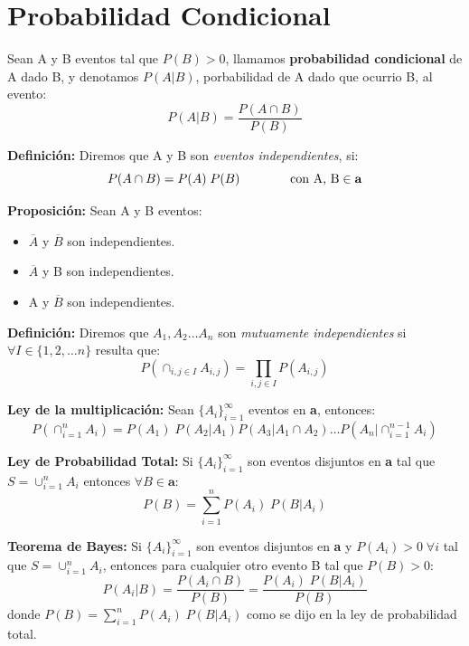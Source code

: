 \documentclass[12pt,a4paper]{report}
\begin{document}
		
	\section{Probabilidad Condicional}
		\par Sean A y B eventos tal que $P(B) > 0$, llamamos \textbf{probabilidad condicional} de A dado B, y denotamos $P(A | B)$, porbabilidad de A dado que ocurrio B, al evento:
		\[
			P(A | B) = \frac{P(A \cap B)}{P(B)}
		\]
		
		\vspace{3mm}
		\par \textbf{Definición:} Diremos que A y B son \textit{eventos independientes}, si:
		\[
			P(A \cap B) = P(A) \; P(B) \qquad\qquad \textup{con A, B} \in \textbf{a}
		\]
	
		\vspace{3mm}
		\par \textbf{Proposición:} Sean A y B eventos:
		\begin{itemize}
			\item $\overline{A}$ y $\overline{B}$ son independientes.
			\item $\overline{A}$ y B son independientes.
			\item A y $\overline{B}$ son independientes.
		\end{itemize}
		
		\vspace{3mm}
		\par \textbf{Definición:} Diremos que $A_{1}, A_{2} \dotsc A_{n}$ son \textit{mutuamente independientes} si $\forall I \in \lbrace 1, 2, \dotsc n \rbrace$ resulta que:
		\[
			P(\cap_{i, j \in I} A_{i, j}) = \prod_{i, j \in I} P(A_{i, j})
		\]
		
		\vspace{3mm}
		\par \textbf{Ley de la multiplicación:} Sean $\lbrace A_{i} \rbrace_{i=1}^{\infty}$
eventos en \textbf{a}, entonces:
		\[
			P(\cap_{i = 1}^{n} A_{i}) = P(A_{1}) \; P(A_{2} | A_{1}) P(A_{3} | A_{1} \cap A_{2}) \dotsc P(A_{n} | \cap_{i=1}^{n - 1} A_{i})
		\]
		
		\vspace{3mm}
		\par \textbf{Ley de Probabilidad Total:} Si $\lbrace A_{i} \rbrace_{i=1}^{\infty}$ son eventos disjuntos en \textbf{a} tal que $S = \cup_{i=1}^{n} A_{i}$ entonces $\forall B \in \textbf{a}$:
		\[
			P(B) = \sum_{i=1}^{n} P(A_{i}) \; P(B | A_{i})
		\]
		
		\vspace{3mm}
		\par \textbf{Teorema de Bayes:} Si $\lbrace A_{i} \rbrace_{i=1}^{\infty}$ son eventos disjuntos en \textbf{a} y $P(A_{i}) > 0 \; \forall i$ tal que $S = \cup_{i=1}^{n} A_{i}$, entonces para cualquier otro evento B tal que $P(B) > 0$:
		\[
			P(A_{i} | B) = \frac{P(A_{i} \cap B)}{P(B)} = \frac{P(A_{i}) \; P(B | A_{i})}{P(B)}
		\]
		donde $P(B) = \sum_{i=1}^{n} P(A_{i}) \; P(B | A_{i})$ como se dijo en la ley de probabilidad total.
	
\end{document}
